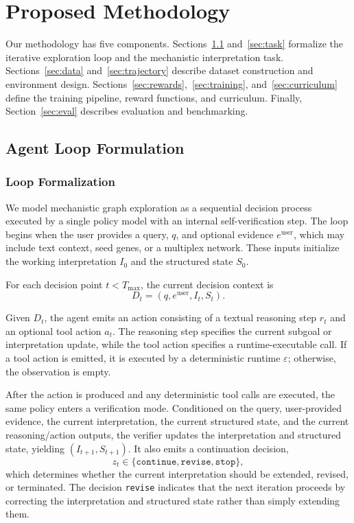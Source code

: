 \documentclass[thesis,letterpaper,12pt]{utthesis}
\begin{document}
\section{Proposed Methodology}\label{sec:methods}
Our methodology has five components. Sections~\ref{sec:agent_loop} and~\ref{sec:task} formalize the iterative exploration loop and the mechanistic interpretation task. Sections~\ref{sec:data} and~\ref{sec:trajectory} describe dataset construction and environment design. Sections~\ref{sec:rewards},~\ref{sec:training}, and~\ref{sec:curriculum} define the training pipeline, reward functions, and curriculum. Finally, Section~\ref{sec:eval} describes evaluation and benchmarking.

\subsection{Agent Loop Formulation}\label{sec:agent_loop}
\subsubsection{Loop Formalization}
We model mechanistic graph exploration as a sequential decision process executed by a single policy model with an internal self-verification step. The loop begins when the user provides a query, $q$, and optional evidence $e^{\text{user}}$, which may include text context, seed genes, or a multiplex network. These inputs initialize the working interpretation $I_0$ and the structured state $S_0$.

For each decision point $t < T_{\max}$, the current decision context is
\[
D_t = (q, e^{\text{user}}, I_t, S_t).
\]

Given $D_t$, the agent emits an action consisting of a textual reasoning step $r_t$ and an optional tool action $a_t$. The reasoning step specifies the current subgoal or interpretation update, while the tool action specifies a runtime-executable call. If a tool action is emitted, it is executed by a deterministic runtime $\varepsilon$; otherwise, the observation is empty.

After the action is produced and any deterministic tool calls are executed, the same policy enters a verification mode. Conditioned on the query, user-provided evidence, the current interpretation, the current structured state, and the current reasoning/action outputs, the verifier updates the interpretation and structured state, yielding $(I_{t+1}, S_{t+1})$. It also emits a continuation decision,
\[
z_t \in \{\texttt{continue}, \texttt{revise}, \texttt{stop}\},
\]
which determines whether the current interpretation should be extended, revised, or terminated. The decision \texttt{revise} indicates that the next iteration proceeds by correcting the interpretation and structured state rather than simply extending them.
\end{document}
